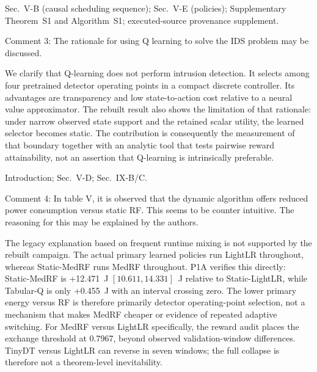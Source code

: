 \documentclass[10pt,a4paper]{article}
\begin{document}
\begin{wherebox}
Sec.~V-B (causal scheduling sequence); Sec.~V-E (policies); Supplementary Theorem~S1 and Algorithm~S1; executed-source provenance supplement.
\end{wherebox}

\begin{rcommentbox}
Comment 3: The rationale for using Q learning to solve the IDS problem may be discussed.
\end{rcommentbox}

\begin{authorresponsebox}
We clarify that Q-learning does not perform intrusion detection. It selects among four pretrained detector operating points in a compact discrete controller. Its advantages are transparency and low state-to-action cost relative to a neural value approximator. The rebuilt result also shows the limitation of that rationale: under narrow observed state support and the retained scalar utility, the learned selector becomes static. The contribution is consequently the measurement of that boundary together with an analytic tool that tests pairwise reward attainability, not an assertion that Q-learning is intrinsically preferable.
\end{authorresponsebox}

\begin{wherebox}
Introduction; Sec.~V-D; Sec.~IX-B/C.
\end{wherebox}

\begin{rcommentbox}
Comment 4: In table V, it is observed that the dynamic algorithm offers reduced power consumption versus static RF. This seems to be counter intuitive. The reasoning for this may be explained by the authors.
\end{rcommentbox}

\begin{authorresponsebox}
The legacy explanation based on frequent runtime mixing is not supported by the rebuilt campaign. The actual primary learned policies run LightLR throughout, whereas Static-MedRF runs MedRF throughout. P1A verifies this directly: Static-MedRF is +12.471~J $[10.611, 14.331]$~J relative to Static-LightLR, while Tabular-Q is only +0.455~J with an interval crossing zero. The lower primary energy versus RF is therefore primarily detector operating-point selection, not a mechanism that makes MedRF cheaper or evidence of repeated adaptive switching. For MedRF versus LightLR specifically, the reward audit places the exchange threshold at 0.7967, beyond observed validation-window differences. TinyDT versus LightLR can reverse in seven windows; the full collapse is therefore not a theorem-level inevitability.
\end{authorresponsebox}
\end{document}
